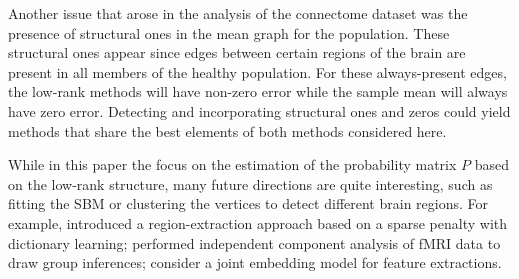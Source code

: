 \documentclass[journal,twoside,web]{ieeecolor}
\begin{document}
Another issue that arose in the analysis of the connectome dataset was the presence of structural ones in the mean graph for the population.
These structural ones appear since edges between certain regions of the brain are present in all members of the healthy population.
For these always-present edges, the low-rank methods will have non-zero error while the sample mean will always have zero error.
Detecting and incorporating structural ones and zeros could yield methods that share the best elements of both methods considered here.


While in this paper the focus on the estimation of the probability matrix $P$ based on the low-rank structure, many future directions are quite interesting, such as fitting the SBM or clustering the vertices to detect different brain regions.
For example, \cite{abraham2013extracting} introduced a region-extraction approach based on a sparse penalty with dictionary learning; \cite{calhoun2001method} performed independent component analysis of fMRI data to draw group inferences; \cite{wang2017joint} consider a joint embedding model for feature extractions.




\end{document}
